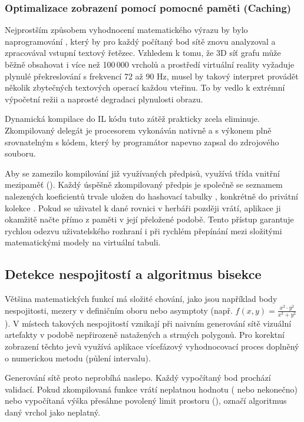 \documentclass[czech, kiv, sem, he, iso690alph, pdf,viewonly]{fasthesis}
\begin{document}
\subsubsection{Optimalizace zobrazení pomocí pomocné paměti (Caching)}
Nejprostším způsobem vyhodnocení matematického výrazu by bylo naprogramování , který by pro každý počítaný bod sítě znovu analyzoval a zpracovával vstupní textový řetězec. Vzhledem k tomu, že 3D síť grafu může běžně obsahovat i více než 100\,000 vrcholů a prostředí virtuální reality vyžaduje plynulé překreslování s frekvencí 72 až 90 Hz, musel by takový interpret provádět několik zbytečných textových operací každou vteřinu. To by vedlo k extrémní výpočetní režii a naprosté degradaci plynulosti obrazu.

Dynamická kompilace do IL kódu tuto zátěž prakticky zcela eliminuje. Zkompilovaný delegát je procesorem vykonáván nativně a s výkonem plně srovnatelným s kódem, který by programátor napevno zapsal do zdrojového souboru.

Aby se zamezilo kompilování již využívaných předpisů, využívá třída  vnitřní mezipaměť (). 
Každý úspěšně zkompilovaný předpis je společně se seznamem nalezených koeficientů trvale uložen do hashovací tabulky , konkrétně do privátní kolekce . 
Pokud se uživatel k dané rovnici v herbáři později vrátí, aplikace ji okamžitě načte přímo z paměti v její přeložené podobě. 
Tento přístup garantuje rychlou odezvu uživatelského rozhraní i při rychlém přepínání mezi složitými matematickými modely na virtuální tabuli.

\subsection{Detekce nespojitostí a algoritmus bisekce}
Většina matematických funkcí má složité chování, jako jsou například body nespojitosti, mezery v definičním oboru nebo asymptoty (např. $f(x,y) = \frac{x^2 \cdot y^2}{x^3 + y^2}$). 
V místech takových nespojitostí vznikají při naivním generování sítě vizuální artefakty v podobě nepřirozeně natažených a strmých polygonů. 
Pro korektní zobrazení těchto jevů využívá aplikace vícefázový vyhodnocovací proces doplněný o numerickou metodu  (půlení intervalu).

Generování sítě proto neprobíhá naslepo. Každý vypočítaný bod prochází validací. 
Pokud zkompilovaná funkce vrátí neplatnou hodnotu ( nebo nekonečno) nebo vypočítaná výška přesáhne povolený limit prostoru (), označí algoritmus daný vrchol jako neplatný. 
\end{document}
